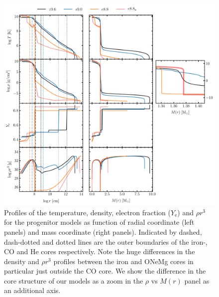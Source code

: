\documentclass[fleqn,usenatbib]{mnras}
\begin{document}

\begin{figure}
 \centering
 \includegraphics[width=\textwidth]{./pic/progenitors_tem_rho_ye_rhor}
 \caption{Profiles of the temperature, density, electron fraction ($Y_{\text{e}}$) and $\rho r^3$ for the progenitor models as function of radial coordinate (left panels) and mass coordinate (right panels). Indicated by dashed, dash-dotted and dotted lines are the outer boundaries of the iron-, CO and He cores respectively. Note the huge differences in the density and $\rho r^3$ profiles between the iron and ONeMg cores in particular just outside the CO core. We show the difference in the core structure of our models as a zoom in the $\rho$ vs $M(r)$ panel as an additional axis.}
 \label{fig:prog_tem_rho_ye_rhor}
\end{figure}
\end{document}
